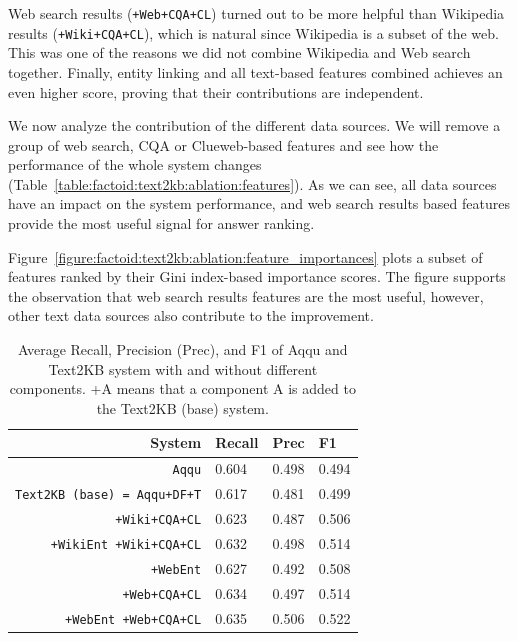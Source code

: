 Web search results (\texttt{+Web+CQA+CL}) turned out to be more helpful than Wikipedia results (\texttt{+Wiki+CQA+CL}), which is natural since Wikipedia is a subset of the web.
This was one of the reasons we did not combine Wikipedia and Web search together.
Finally, entity linking and all text-based features combined achieves an even higher score, proving that their contributions are independent.

We now analyze the contribution of the different data sources.
We will remove a group of web search, CQA or Clueweb-based features and see how the performance of the whole system changes (Table~\ref{table:factoid:text2kb:ablation:features}).
As we can see, all data sources have an impact on the system performance, and web search results based features provide the most useful signal for answer ranking.

Figure~\ref{figure:factoid:text2kb:ablation:feature_importances} plots a subset of features ranked by their Gini index-based importance scores.
The figure supports the observation that web search results features are the most useful, however, other text data sources also contribute to the improvement.

\begin{table}
\centering
\begin{tabular}{rlll}
System & Recall & Prec & F1 \\
\hline
\texttt{Aqqu} & 0.604 & 0.498 & 0.494\\
\texttt{Text2KB (base) = Aqqu+DF+T} & 0.617 & 0.481 & 0.499 \\
\hline
\texttt{+Wiki+CQA+CL} & 0.623 & 0.487 & 0.506 \\
\texttt{+WikiEnt +Wiki+CQA+CL} & 0.632 & 0.498 & 0.514 \\
\hline
\texttt{+WebEnt} & 0.627 & 0.492 & 0.508 \\
\texttt{+Web+CQA+CL} & 0.634 & 0.497 & 0.514 \\
\texttt{+WebEnt +Web+CQA+CL} & 0.635 & 0.506 & 0.522 \\
\end{tabular}
\caption{Average Recall, Precision (Prec), and F1 of Aqqu and Text2KB system with and without different components. +A means that a component A is added to the Text2KB (base) system.}
\label{table:factoid:text2kb:ablation:entities_vs_features}
\end{table}

